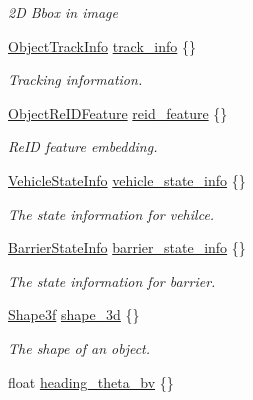 \begin{DoxyCompactItemize}
\begin{DoxyCompactList}\small\item\em 2D Bbox in image \end{DoxyCompactList}\item 
\hyperlink{structmaf__perception__interface_1_1ObjectTrackInfo}{Object\+Track\+Info} \hyperlink{structmaf__perception__interface_1_1Object_a036ef252370b473cb48ecc51e830af10}{track\+\_\+info} \{\}
\begin{DoxyCompactList}\small\item\em Tracking information. \end{DoxyCompactList}\item 
\hyperlink{structmaf__perception__interface_1_1ObjectReIDFeature}{Object\+Re\+I\+D\+Feature} \hyperlink{structmaf__perception__interface_1_1Object_af30ab1b06d4e65ec0f702c76d7c722d8}{reid\+\_\+feature} \{\}
\begin{DoxyCompactList}\small\item\em Re\+ID feature embedding. \end{DoxyCompactList}\item 
\hyperlink{structmaf__perception__interface_1_1VehicleStateInfo}{Vehicle\+State\+Info} \hyperlink{structmaf__perception__interface_1_1Object_a5fa4ed2e336f320531b68c914a2f78e4}{vehicle\+\_\+state\+\_\+info} \{\}
\begin{DoxyCompactList}\small\item\em The state information for vehilce. \end{DoxyCompactList}\item 
\hyperlink{structmaf__perception__interface_1_1BarrierStateInfo}{Barrier\+State\+Info} \hyperlink{structmaf__perception__interface_1_1Object_a6a0b2fe6674f22fbe489b441450167e7}{barrier\+\_\+state\+\_\+info} \{\}
\begin{DoxyCompactList}\small\item\em The state information for barrier. \end{DoxyCompactList}\item 
\hyperlink{structmaf__perception__interface_1_1Shape3f}{Shape3f} \hyperlink{structmaf__perception__interface_1_1Object_a16a8ff82478181154a2fb21a383f55bc}{shape\+\_\+3d} \{\}
\begin{DoxyCompactList}\small\item\em The shape of an object. \end{DoxyCompactList}\item 
float \hyperlink{structmaf__perception__interface_1_1Object_acb144a5dab282251e08c3f9ce3f4a44b}{heading\+\_\+theta\+\_\+bv} \{\}

\end{DoxyCompactItemize}
